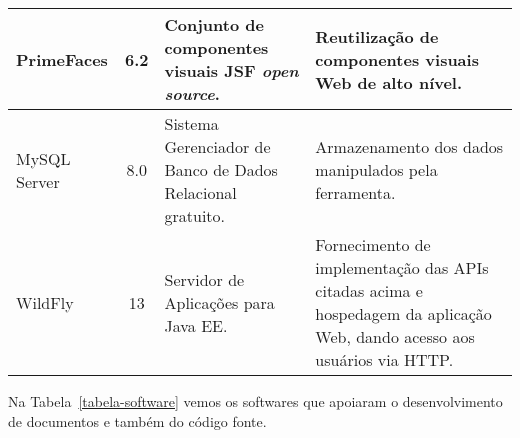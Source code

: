 \begin{footnotesize}
\begin{longtable}{|p{1.8cm}|c|p{5cm}|p{6.3cm}|}
	PrimeFaces & 6.2 &  Conjunto de componentes visuais JSF \textit{open source}. & Reutilização de componentes visuais Web de alto nível. \\\hline
	
	MySQL Server & 8.0 & Sistema Gerenciador de Banco de Dados Relacional gratuito. & Armazenamento dos dados manipulados pela ferramenta. \\\hline
	
	WildFly & 13 & Servidor de Aplicações para Java EE. & Fornecimento de implementação das APIs citadas acima e hospedagem da aplicação Web, dando acesso aos usuários via HTTP. \\\hline
\end{longtable}
\end{footnotesize}







Na Tabela~\ref{tabela-software} vemos os softwares que apoiaram o desenvolvimento de documentos e também do código fonte.

